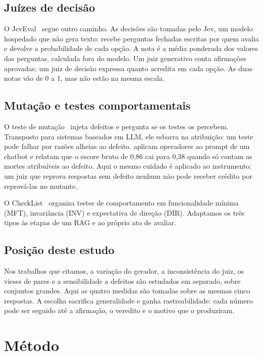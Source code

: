 \documentclass[12pt]{article}
\begin{document}
\subsection{Juízes de decisão}

O JevEval~\cite{deepeval2026jeveval} segue outro caminho. As decisões são tomadas
pelo Jev, um modelo hospedado que não gera texto: recebe perguntas fechadas
escritas por quem avalia e devolve a probabilidade de cada opção. A nota é a
média ponderada dos valores das perguntas, calculada fora do modelo. Um juiz
generativo conta afirmações aprovadas; um juiz de decisão expressa quanto
acredita em cada opção. As duas notas vão de 0 a 1, mas não estão na mesma
escala.

\subsection{Mutação e testes comportamentais}

O teste de mutação~\cite{demillo1978hints,jia2011analysis} injeta defeitos e
pergunta se os testes os percebem. Transposto para sistemas baseados em LLM, ele
esbarra na atribuição: um teste pode falhar por razões alheias ao defeito.
\citet{braga2026mutation} aplicam operadores ao prompt de um chatbot e relatam que
o escore bruto de 0,86 cai para 0,38 quando só contam as mortes atribuíveis ao
defeito. Aqui o mesmo cuidado é aplicado ao instrumento: um juiz que reprova
respostas sem defeito nenhum não pode receber crédito por reprová-las no mutante.

O CheckList~\cite{ribeiro2020checklist} organiza testes de comportamento em
funcionalidade mínima (MFT), invariância (INV) e expectativa de direção (DIR).
Adaptamos os três tipos às etapas de um RAG e ao próprio ato de avaliar.

\subsection{Posição deste estudo}

Nos trabalhos que citamos, a variação do gerador, a inconsistência do juiz, os
vieses de pares e a sensibilidade a defeitos são estudados em separado, sobre
conjuntos grandes. Aqui as quatro medidas são tomadas sobre as mesmas cinco
respostas. A escolha sacrifica generalidade e ganha rastreabilidade: cada número
pode ser seguido até a afirmação, o veredito e o motivo que o produziram.

\section{Método}
\label{sec:metodo}
\end{document}
